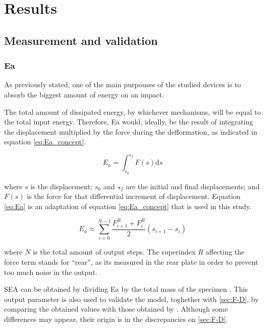 \chapter{Results}
\label{results}

\section{Measurement and validation}

\subsection{Ea}  %
\label{sec:Ea}

As previously stated, one of the main purpouses of the studied devices is to absorb the biggest amount of energy on an impact.

The total amount of dissipated energy, by whichever mechanisms, will be equal to the total input energy. Therefore, \gls{Ea} would, ideally, be the result of integrating the displacement multiplied by the force during the defformation, as indicated in equation \ref{eq:Ea_concept}.

\begin{equation}
E_a = \int_{s_0}^{s_f} F(s) \mathrm{d}s
\label{eq:Ea_concept}
\end{equation}

where $s$ is the displacement; $s_0$ and $s_f$ are the initial and final displacements; and $F(s)$ is the force for that differential increment of displacement. Equation \ref{eq:Ea} is an adaptation of equation \ref{eq:Ea_concept} that is used in this study.

\begin{equation}
E_a \approx \displaystyle\sum_{i=0}^{N-1} \frac{F_{i+1}^R+F_{i}^R}{2} \left(s_{i+1}-s_{i}\right)
\label{eq:Ea}
\end{equation}

where $N$ is the total amount of output steps. The superindex $R$ affecting the force term stands for ``rear'', as its measured in the rear plate in order to prevent too much noise in the output.

\Gls{SEA} can be obtained by dividing \gls{Ea} by the total mass of the specimen \citep{Lee2006, Peroni2009, Scattina2011}. This output parameter is also used to validate the model, toghether with \ref{sec:F-D}, by comparing the obtained values with those obtained by \citet{Peroni2009}. Although some differences may appear, their origin is in the discrepancies on \ref{sec:F-D}.

